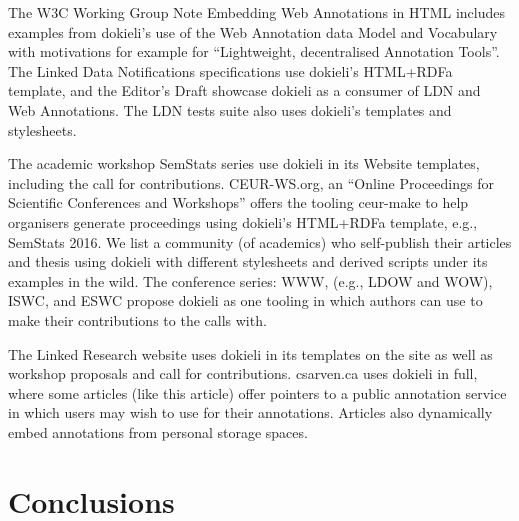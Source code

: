 \documentclass[a4paper]{llncs}
\begin{document}
                                
                                    
\par The W3C Working Group Note \empty Embedding Web Annotations in HTML includes examples from dokieli’s use of the Web Annotation data \empty Model and \empty Vocabulary with motivations for example for ``Lightweight, decentralised Annotation Tools''.
                                    The \empty Linked Data Notifications specifications use dokieli’s HTML+RDFa template, and the \empty Editor’s Draft showcase dokieli as a consumer of LDN and Web Annotations. The LDN \empty tests suite also uses dokieli’s templates and stylesheets.

                                    
\par The academic workshop \empty SemStats series use dokieli in its Website templates, including the call for contributions. \empty CEUR-WS.org, an ``Online Proceedings for Scientific Conferences and Workshops'' offers the tooling \empty ceur-make to help organisers generate proceedings using dokieli’s HTML+RDFa template, e.g., \empty SemStats 2016.
                                    We list a community (of academics) who self-publish their articles and thesis using dokieli with different stylesheets and derived scripts under its \empty examples in the wild. The conference series: WWW, (e.g., \empty LDOW and \empty WOW), \empty ISWC, and \empty ESWC propose dokieli as one tooling in which authors can use to make their contributions to the calls with.

                                    
\par The \empty Linked Research website uses dokieli in its templates on the site as well as workshop proposals and call for contributions.
                                    \empty csarven.ca uses dokieli in full, where some articles (like this article) offer pointers to a public annotation service in which users may wish to use for their annotations. Articles also dynamically embed annotations from personal storage spaces.
                                
                            
                        
                    

                    
                        \section{Conclusions}
  \label{conclusions}
\end{document}
